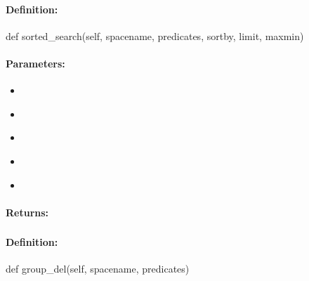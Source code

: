\paragraph{Definition:}
\begin{pythoncode}
def sorted_search(self, spacename, predicates, sortby, limit, maxmin)
\end{pythoncode}

\paragraph{Parameters:}
\begin{itemize}[noitemsep]
\item {}\\

\item {}\\

\item {}\\

\item {}\\

\item {}\\

\end{itemize}

\paragraph{Returns:}


\pagebreak
\subsubsection{}
\label{api:python:group_del}


\paragraph{Definition:}
\begin{pythoncode}
def group_del(self, spacename, predicates)
\end{pythoncode}

